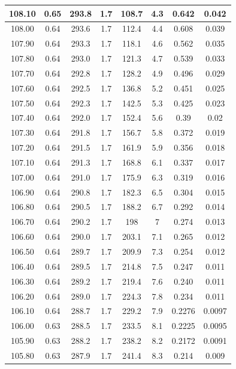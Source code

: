 \documentclass[12pt, a4paper, oneside]{article}
\begin{document}
\begin{longtable}{|c|c|c|c|c|c|c|c|}
    108.10 & 0.65 & 293.8 & 1.7 & 108.7 & 4.3 & 0.642 & 0.042 \\\hline
    108.00 & 0.64 & 293.6 & 1.7 & 112.4 & 4.4 & 0.608 & 0.039 \\\hline
    107.90 & 0.64 & 293.3 & 1.7 & 118.1 & 4.6 & 0.562 & 0.035 \\\hline
    107.80 & 0.64 & 293.0 & 1.7 & 121.3 & 4.7 & 0.539 & 0.033 \\\hline
    107.70 & 0.64 & 292.8 & 1.7 & 128.2 & 4.9 & 0.496 & 0.029 \\\hline
    107.60 & 0.64 & 292.5 & 1.7 & 136.8 & 5.2 & 0.451 & 0.025 \\\hline
    107.50 & 0.64 & 292.3 & 1.7 & 142.5 & 5.3 & 0.425 & 0.023 \\\hline
    107.40 & 0.64 & 292.0 & 1.7 & 152.4 & 5.6 & 0.39 & 0.02 \\\hline
    107.30 & 0.64 & 291.8 & 1.7 & 156.7 & 5.8 & 0.372 & 0.019 \\\hline
    107.20 & 0.64 & 291.5 & 1.7 & 161.9 & 5.9 & 0.356 & 0.018 \\\hline
    107.10 & 0.64 & 291.3 & 1.7 & 168.8 & 6.1 & 0.337 & 0.017 \\\hline
    107.00 & 0.64 & 291.0 & 1.7 & 175.9 & 6.3 & 0.319 & 0.016 \\\hline
    106.90 & 0.64 & 290.8 & 1.7 & 182.3 & 6.5 & 0.304 & 0.015 \\\hline
    106.80 & 0.64 & 290.5 & 1.7 & 188.2 & 6.7 & 0.292 & 0.014 \\\hline
    106.70 & 0.64 & 290.2 & 1.7 & 198 & 7 & 0.274 & 0.013 \\\hline
    106.60 & 0.64 & 290.0 & 1.7 & 203.1 & 7.1 & 0.265 & 0.012 \\\hline
    106.50 & 0.64 & 289.7 & 1.7 & 209.9 & 7.3 & 0.254 & 0.012 \\\hline
    106.40 & 0.64 & 289.5 & 1.7 & 214.8 & 7.5 & 0.247 & 0.011 \\\hline
    106.30 & 0.64 & 289.2 & 1.7 & 219.4 & 7.6 & 0.240 & 0.011 \\\hline
    106.20 & 0.64 & 289.0 & 1.7 & 224.3 & 7.8 & 0.234 & 0.011 \\\hline
    106.10 & 0.64 & 288.7 & 1.7 & 229.2 & 7.9 & 0.2276 & 0.0097 \\\hline
    106.00 & 0.63 & 288.5 & 1.7 & 233.5 & 8.1 & 0.2225 & 0.0095 \\\hline
    105.90 & 0.63 & 288.2 & 1.7 & 238.2 & 8.2 & 0.2172 & 0.0091 \\\hline
    105.80 & 0.63 & 287.9 & 1.7 & 241.4 & 8.3 & 0.214 & 0.009 \\\hline

\end{longtable}
\end{document}

